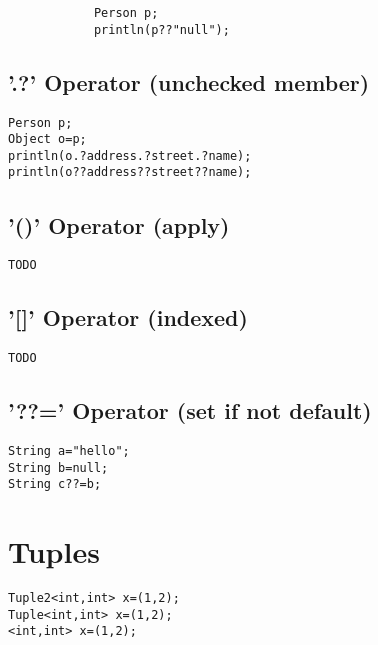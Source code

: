 \documentclass{tufte-book}
\begin{document}
            \begin{lstlisting}
            Person p;
            println(p??"null");
            \end{lstlisting}


            \subsection{'.?' Operator (unchecked member)}
            \begin{lstlisting}
Person p;
Object o=p;
println(o.?address.?street.?name);
println(o??address??street??name);
            \end{lstlisting}

            \subsection{'()' Operator (apply)}
            \begin{lstlisting}
TODO
            \end{lstlisting}

            \subsection{'[]' Operator (indexed)}
            \begin{lstlisting}
TODO
            \end{lstlisting}

            \subsection{'??=' Operator (set if not default)}
            \begin{lstlisting}
String a="hello";
String b=null;
String c??=b;
            \end{lstlisting}

            \section{Tuples}
            \begin{lstlisting}
Tuple2<int,int> x=(1,2);
Tuple<int,int> x=(1,2);
<int,int> x=(1,2);
            \end{lstlisting}
\end{document}
